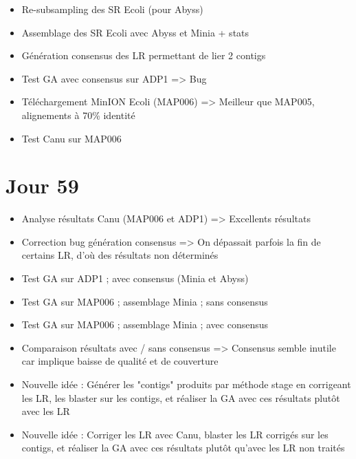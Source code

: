 \documentclass[12pt]{report}
\begin{document}
\begin{itemize}
	\item Re-subsampling des SR Ecoli (pour Abyss)
	
	\item Assemblage des SR Ecoli avec Abyss et Minia + stats
	
	\item Génération consensus des LR permettant de lier 2 contigs
	
	\item Test GA avec consensus sur ADP1 => Bug
	
	\item Téléchargement MinION Ecoli (MAP006) => Meilleur que MAP005, alignements à 70\% identité
	
	\item Test Canu sur MAP006
\end{itemize}

\section{Jour 59}

\begin{itemize}
	\item Analyse résultats Canu (MAP006 et ADP1) => Excellents résultats
	
	\item Correction bug génération consensus => On dépassait parfois la fin de certains LR, d'où des résultats non déterminés
	
	\item Test GA sur ADP1 ; avec consensus (Minia et Abyss)
	
	\item Test GA sur MAP006 ; assemblage Minia ; sans consensus

	\item Test GA sur MAP006 ; assemblage Minia ; avec consensus
	
	\item Comparaison résultats avec / sans consensus => Consensus semble inutile car implique baisse de qualité et de couverture
	
	\item Nouvelle idée : Générer les "contigs" produits par méthode stage en corrigeant les LR, les blaster sur les contigs, et
		  réaliser la GA avec ces résultats plutôt avec les LR 
	
	\item Nouvelle idée : Corriger les LR avec Canu, blaster les LR corrigés sur les contigs, et réaliser la GA avec ces résultats plutôt
		  qu'avec les LR non traités
\end{itemize}
\end{document}
